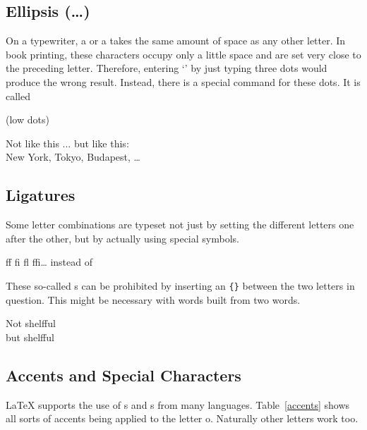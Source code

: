 \subsection{Ellipsis (\texorpdfstring{\ldots}{...})}

On a typewriter, a  or a  takes the same amount of
space as any other letter. In book printing, these characters occupy
only a little space and are set very close to the preceding letter.
Therefore, entering `' by just typing three
dots would produce the wrong result. Instead, there is a special
command for these dots. It is called

\begin{lscommand}
 (low dots)
\end{lscommand}


\begin{example}
Not like this ... but like this:\\
New York, Tokyo, Budapest, \ldots
\end{example}

\subsection{Ligatures}

Some letter combinations are typeset not just by setting the
different letters one after the other, but by actually using special
symbols.
\begin{code}
{\large ff fi fl ffi\ldots}\quad
instead of
\end{code}
These so-called s can be prohibited by inserting an \verb|{}|
between the two letters in question. This might be necessary with
words built from two words.

\begin{example}
\Large Not shelfful\\
but shelf\mbox{}ful
\end{example}

\subsection{Accents and Special Characters}

\LaTeX{} supports the use of s and s
from many languages. Table~\ref{accents} shows all sorts of accents
being applied to the letter o. Naturally other letters work too.

